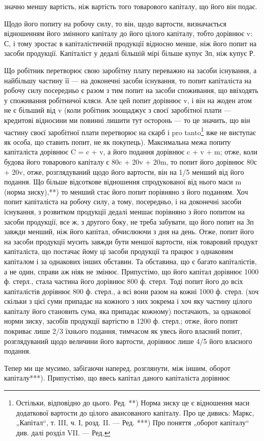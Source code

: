 значно меншу вартість, ніж вартість того товарового капіталу, що
його він подає.

Щодо його попиту на робочу силу, то він, щодо вартости, визначається
відношенням його змінного капіталу до його цілого капіталу,
тобто дорівнює v: С, і тому зростає в капіталістичній продукції
відносно менше, ніж його попит на засоби продукції. Капіталіст
у дедалі більшій мірі більше купує Зп, ніж купує Р.

Що робітник перетворює свою заробітну плату переважно на засоби
існування, а найбільшу частину її — на доконечні засоби існування, то попит
капіталіста на робочу силу посередньо є разом з тим попит на засоби споживання,
що ввіходять у споживання робітничої кляси. Але цей попит
дорівнює v, і він на жоден атом не є більший від v (коли робітник зоощаджує
з своєї заробітної плати — кредитові відносини ми повинні лишити
тут осторонь — то це значить, що він частину своєї заробітної плати
перетворює на скарб і pro tanto\footnote*{
Остільки, відповідно до цього. Ред.
**) Норма зиску це є відношення маси додаткової вартости до цілого авансованого
капіталу. Про це дивись: Маркс, „Капітал“, т. III, ч. І, розд. II. —
Ред.
***) Про поняття „оборот капіталу“ див. далі розділ VII. — Ред.
} вже не виступає як особа, що ставить
попит, не як покупець). Максимальна межа попиту капіталіста дорівнює
C = c + v, а його подання дорівнює c + v + m; отже, коли будова
його товарового капіталу є 80c + 20v + 20m, то попит його дорівнює
80с + 20v, отже, розглядуваний щодо його вартости, він на 1/5 менший
від його подання. Що більше відсоткове відношення спродукованої від нього
маси m (норма зиску),**) то менший стає його попит порівняно з його
поданням. Хоч попит капіталіста на робочу силу, а тому, посередньо, і
на доконечні засоби існування, з розвитком продукції дедалі меншає порівняно
з його попитом на засоби продукції, все ж, з другого боку, не
треба забувати, що його попит на Зп завжди менший, ніж його капітал,
обчислюючи з дня на день. Отже, попит його на засоби продукції
мусить завжди бути меншої вартости, ніж товаровий продукт капіталіста,
що постачає йому ці засоби продукції та працює з однаковим
капіталом і за однакових інших обставин. Та обставина, що є
багато капіталістів, а не один, справи аж ніяк не змінює. Припустімо,
що його капітал дорівнює 1000 ф. стерл., стала частина його дорівнює
800 ф. стерл. Тоді попит його до всіх капіталістів дорівнює 800 ф. стерл.,
а всі вони разом на кожні 1000 ф. стерл. (хоч скільки з цієї суми припадає
на кожного з них зокрема і хоч яку частину цілого капіталу його
становить сума, яка припадає кожному) постачають, за однакової норми
зиску, засобів продукції вартістю в 1200 ф. стерл.; отже, його попит покриває
лише 2/3 їхнього подання, тимчасом як увесь його власний попит,
розглядуваний щодо величини його вартости, дорівнює лише 4/5
його власного подання.

Тепер ми ще мусимо, забігаючи наперед, розглянути, між іншим, оборот
капіталу***). Припустімо, що ввесь капітал даного капіталіста дорівнює
